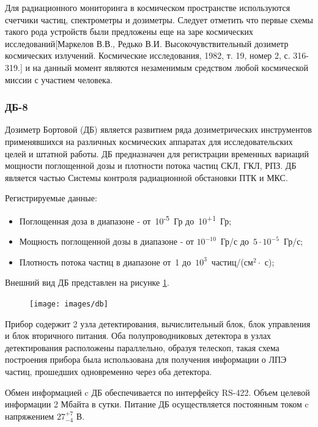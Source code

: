 Для радиационного мониторинга в космическом пространстве используются счетчики частиц, спектрометры и дозиметры. Следует отметить что первые схемы такого рода устройств были предложены еще на заре космических исследований[Маркелов В.В., Редько В.И. Высокочувствительный дозиметр космических излучений. Космические исследования, 1982, т. 19, номер 2, с. 316-319.] и на данный момент являются незаменимым средством любой космической миссии с участием человека. 

\subsubsection{ДБ-8}

Дозиметр Бортовой (ДБ) является развитием ряда дозиметрических инструментов применявшихся на различных космических аппаратах для исследовательских целей и штатной работы. ДБ предназначен для регистрации временных вариаций мощности поглощенной дозы и плотности потока частиц СКЛ, ГКЛ, РПЗ. ДБ является частью  Системы контроля радиационной обстановки ПТК и МКС. 

Регистрируемые данные:
\begin{itemize}
	\item 
	Поглощенная доза в диапазоне - от~10\textsuperscript{-5}~Гр  до~10\textsuperscript{+1}~Гр;  
	\item  
	Мощность поглощенной дозы в диапазоне - от $10^{-10}$~Гр/с  до~$5\cdot10^{-5}$~Гр/с;
	\item  
	Плотность потока частиц в диапазоне от~1 до~$ 10^3 $~частиц/(см$^2\cdot$ с);    		
\end{itemize}

Внешний вид ДБ представлен на рисунке \ref{fig:db}.

\begin{figure}
\centering
\texttt{[image: images/db]}
\caption{}
\label{fig:db}
\end{figure}

Прибор содержит 2 узла детектирования, вычислительный блок, блок управления и блок вторичного питания. Оба полупроводниковых детектора в узлах детектирования расположены  параллельно,  образуя телескоп, такая схема построения прибора была использована для получения информации о ЛПЭ частиц, прошедших одновременно через оба детектора.         


Обмен информацией c ДБ обеспечивается по интерфейсу RS-422. Объем целевой информации 2 Мбайта в сутки. Питание ДБ осуществляется постоянным током c напряжением $ 27^{+7}_{-4} $ В. 

